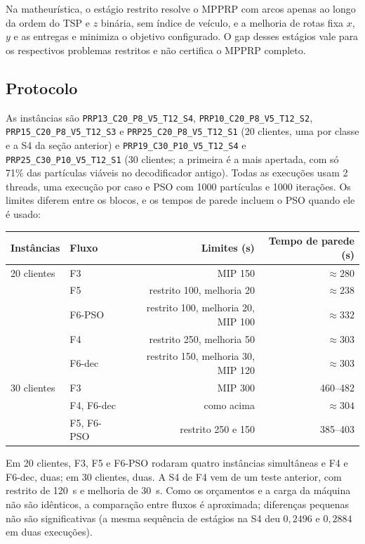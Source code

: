 \documentclass[11pt,a4paper]{article}
\begin{document}
Na matheurística, o estágio restrito resolve o MPPRP com arcos apenas ao longo
da ordem do TSP e $z$ binária, sem índice de veículo, e a melhoria de rotas
fixa $x$, $y$ e as entregas e minimiza o objetivo configurado. O gap desses
estágios vale para os respectivos problemas restritos e não certifica o
MPPRP completo.

\subsection{Protocolo}

As instâncias são \texttt{PRP13\_C20\_P8\_V5\_T12\_S4}, \texttt{PRP10\_C20\_P8\_V5\_T12\_S2},
\texttt{PRP15\_C20\_P8\_V5\_T12\_S3} e \texttt{PRP25\_C20\_P8\_V5\_T12\_S1} (20 clientes,
uma por classe e a S4 da seção anterior) e \texttt{PRP19\_C30\_P10\_V5\_T12\_S4} e
\texttt{PRP25\_C30\_P10\_V5\_T12\_S1} (30 clientes; a primeira é a mais apertada,
com só 71\% das partículas viáveis no decodificador antigo). Todas as
execuções usam 2 threads, uma execução por caso e PSO com 1000 partículas e
1000 iterações. Os limites diferem entre os blocos, e os tempos de parede
incluem o PSO quando ele é usado:

\begin{center}
\small
\begin{tabular}{llrr}
\toprule
Instâncias & Fluxo & Limites (s) & Tempo de parede (s) \\
\midrule
20 clientes & F3 & MIP 150 & $\approx280$ \\
 & F5 & restrito 100, melhoria 20 & $\approx238$ \\
 & F6-PSO & restrito 100, melhoria 20, MIP 100 & $\approx332$ \\
 & F4 & restrito 250, melhoria 50 & $\approx303$ \\
 & F6-dec & restrito 150, melhoria 30, MIP 120 & $\approx303$ \\
30 clientes & F3 & MIP 300 & 460--482 \\
 & F4, F6-dec & como acima & $\approx304$ \\
 & F5, F6-PSO & restrito 250 e 150 & 385--403 \\
\bottomrule
\end{tabular}
\end{center}

Em 20 clientes, F3, F5 e F6-PSO rodaram quatro instâncias simultâneas e F4 e
F6-dec, duas; em 30 clientes, duas. A S4 de F4 vem de um teste anterior, com
restrito de 120~s e melhoria de 30~s. Como os orçamentos e a carga da máquina
não são idênticos, a comparação entre fluxos é aproximada; diferenças pequenas
não são significativas (a mesma sequência de estágios na S4 deu $0{,}2496$ e
$0{,}2884$ em duas execuções).
\end{document}
